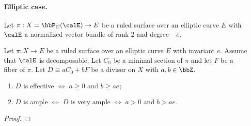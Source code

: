     \paragraph{Elliptic case.} Let \(\pi:X = \bbP_C(\calE) \to E\) be a ruled surface over an elliptic curve \(E\) with \(\calE\) a normalized vector bundle of rank \(2\) and degree \(-e\).

    \begin{theorem}\label{thm:positivity_of_divisors_on_decomposable_ruled_surface_over_elliptic_curve}
        Let \(\pi:X \to E\) be a ruled surface over an elliptic curve \(E\) with invariant \(e\).
        Assume that \(\calE\) is decomposable.
        Let \(C_0\) be a minimal section of \(\pi\) and let \(F\) be a fiber of \(\pi\). 
        Let \(D \equiv aC_0 + bF\) be a divisor on \(X\) with \(a,b \in \bbZ\).
        \begin{enumerate}
            \item \(D\) is effective \(\iff\) \(a \geq 0\) and \(b \geq ae\);
            \item \(D\) is ample \(\iff\) \(D\) is very ample \(\iff\) \(a > 0\) and \(b > ae\).
        \end{enumerate}
    \end{theorem}
    \begin{proof}
    \end{proof}

